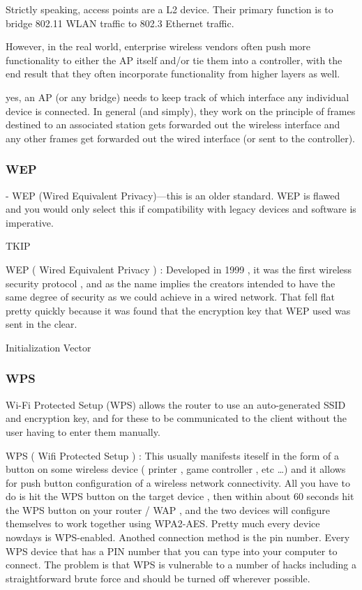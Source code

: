Strictly speaking, access points are a L2 device. Their primary function is to
bridge 802.11 WLAN traffic to 802.3 Ethernet traffic.

However, in the real world, enterprise wireless vendors often push more
functionality to either the AP itself and/or tie them into a controller, with
the end result that they often incorporate functionality from higher layers as
well.

yes, an AP (or any bridge) needs to keep track of which interface any individual
device is connected. In general (and simply), they work on the principle of
frames destined to an associated station gets forwarded out the wireless
interface and any other frames get forwarded out the wired interface (or sent to
the controller).

\subsubsectionend

\subsubsection{WEP}
\label{sssec:wep}


 - WEP (Wired Equivalent Privacy)—this is an older standard. WEP is flawed and
 you would only select this if compatibility with legacy devices and software is
 imperative.

TKIP

WEP ( Wired Equivalent Privacy ) : Developed in 1999 , it was the first wireless
security protocol , and as the name implies the creators intended to have the
same degree of security as we could achieve in a wired network. That fell flat
pretty quickly because it was found that the encryption key that WEP used
was sent in the clear.

Initialization Vector

\subsubsectionend

\subsubsection{WPS}
\label{sssec:wps}


Wi-Fi Protected Setup (WPS) allows the router to use an auto-generated SSID and encryption key, and for these to be communicated to the client without the user having to enter them manually.


WPS ( Wifi Protected Setup ) : This usually manifests iteself in the form of a
button on some wireless device ( printer , game controller , etc \ldots ) and it
allows for push button configuration of a wireless network connectivity. All you
have to do is hit the WPS button on the target device , then within about 60
seconds hit the WPS button on your router / WAP , and the two devices will
configure themselves to work together using WPA2-AES. Pretty much every device
nowdays is WPS-enabled. Anothed connection method is the pin number. Every WPS
device that has a PIN number that you can type into your computer to connect.
The problem is that WPS is vulnerable to a number of hacks including a
straightforward brute force and should be turned off wherever possible.

